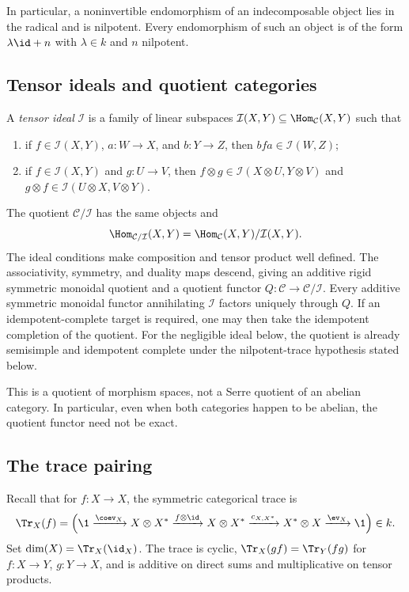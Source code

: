 In particular, a noninvertible endomorphism of an indecomposable object
lies in the radical and is nilpotent. Every endomorphism of such an
object is of the form $\lambda\id+n$ with $\lambda\in k$ and $n$
nilpotent.

\subsection{Tensor ideals and quotient categories}

\begin{definition}
A \emph{tensor ideal} $\mathcal I$ is a family of linear subspaces
$\mathcal I(X,Y)\subseteq\Hom_{\mathcal C}(X,Y)$ such that
\begin{enumerate}
 \item if $f\in\mathcal I(X,Y)$, $a:W\to X$, and $b:Y\to Z$, then
       $bfa\in\mathcal I(W,Z)$;
 \item if $f\in\mathcal I(X,Y)$ and $g:U\to V$, then
       $f\otimes g\in\mathcal I(X\otimes U,Y\otimes V)$ and
       $g\otimes f\in\mathcal I(U\otimes X,V\otimes Y)$.
\end{enumerate}
\end{definition}

The quotient $\mathcal C/\mathcal I$ has the same objects and
\[
 \Hom_{\mathcal C/\mathcal I}(X,Y)
 =\Hom_{\mathcal C}(X,Y)/\mathcal I(X,Y).
\]
The ideal conditions make composition and tensor product well defined.
The associativity, symmetry, and duality maps descend, giving an
additive rigid symmetric monoidal quotient and a quotient functor
$Q:\mathcal C\to\mathcal C/\mathcal I$. Every additive symmetric
monoidal functor annihilating $\mathcal I$ factors uniquely through
$Q$. If an idempotent-complete target is required, one may then take
the idempotent completion of the quotient. For the negligible ideal
below, the quotient is already semisimple and idempotent complete under
the nilpotent-trace hypothesis stated below.

This is a quotient of morphism spaces, not a Serre quotient of an
abelian category. In particular, even when both categories happen to
be abelian, the quotient functor need not be exact.

\subsection{The trace pairing}

Recall that for $f:X\to X$, the symmetric categorical trace is
\[
 \Tr_X(f)=
 \left(\1\xrightarrow{\coev_X}X\otimes X^*
 \xrightarrow{f\otimes\id}X\otimes X^*
 \xrightarrow{c_{X,X^*}}X^*\otimes X
 \xrightarrow{\ev_X}\1\right)\in k.
\]
Set $\dim(X)=\Tr_X(\id_X)$. The trace is cyclic,
$\Tr_X(gf)=\Tr_Y(fg)$ for $f:X\to Y$, $g:Y\to X$,
and is additive on direct sums and multiplicative on tensor products.


